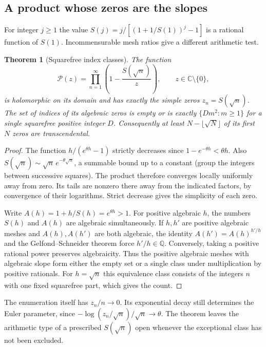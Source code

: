 \documentclass[11pt,a4paper]{article}
\newtheorem{theorem}{Theorem}[section]
\theoremstyle{definition}\newtheorem{definition}[theorem]{Definition}\newtheorem{example}[theorem]{Example}
\theoremstyle{remark}\newtheorem{remark}[theorem]{Remark}
\newcommand{\Q}{\mathbb Q}\newcommand{\Z}{\mathbb Z}\newcommand{\R}{\mathbb R}\newcommand{\N}{\mathbb N}
\begin{document}
\subsection{A product whose zeros are the slopes}
For integer $j\ge1$ the value $S(j)=j/[(1+1/S(1))^j-1]$ is a rational function of $S(1)$. Incommensurable mesh ratios give a different arithmetic test.

\begin{theorem}[Squarefree index classes]
\label{thm:rev-squarefree}
The function
\[
 \mathcal P(z)=\prod_{n=1}^{\infty}
                 \left(1-\frac{S(\sqrt n)}{z}\right),
 \qquad z\in\mathbb C\setminus\{0\},
\]
is holomorphic on its domain and has exactly the simple zeros $z_n=S(\sqrt n)$.
The set of indices of its algebraic zeros is empty or is exactly
$\{Dm^2:m\ge1\}$ for a single squarefree positive integer $D$.
Consequently at least $N-\lfloor\sqrt N\rfloor$ of its first $N$ zeros
are transcendental.
\end{theorem}
\begin{proof}
The function $h/(e^{\theta h}-1)$ strictly decreases since $1-e^{-\theta h}<\theta h$.
Also $S(\sqrt n)\sim\sqrt n\,e^{-\theta\sqrt n}$, a summable bound up to a constant (group the integers between successive squares). The product therefore converges locally uniformly away from zero. Its tails are nonzero there away from the indicated factors, by convergence of their logarithms. Strict decrease gives the simplicity of each zero.

Write $A(h)=1+h/S(h)=e^{\theta h}>1$. For positive algebraic $h$, the numbers $S(h)$ and $A(h)$ are algebraic simultaneously. If $h,h'$ are positive algebraic meshes and $A(h),A(h')$ are both algebraic, the identity $A(h')=A(h)^{h'/h}$ and the Gelfond--Schneider theorem force $h'/h\in\Q$. Conversely, taking a positive rational power preserves algebraicity. Thus the positive algebraic meshes with algebraic slope form either the empty set or a single class under multiplication by positive rationals. For $h=\sqrt n$ this equivalence class consists of the integers $n$ with one fixed squarefree part, which gives the count. 
\end{proof}
The enumeration itself has $z_n/n\to0$. Its exponential decay still determines the Euler parameter, since $-\log(z_n/\sqrt n)/\sqrt n\to\theta$. The theorem leaves the arithmetic type of a prescribed $S(\sqrt n)$ open whenever the exceptional class has not been excluded.
\end{document}
